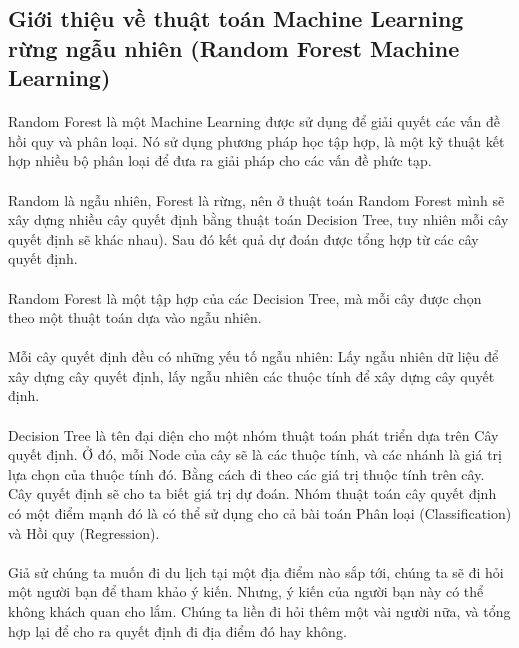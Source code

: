 \documentclass{article}
\begin{document}
\subsection{Giới thiệu về thuật toán Machine Learning rừng ngẫu nhiên (Random Forest Machine Learning)}
\paragraph{}
Random Forest là một Machine Learning được sử dụng để giải quyết các vấn đề hồi quy và phân loại. Nó sử dụng phương pháp học tập hợp, là một kỹ thuật kết hợp nhiều bộ phân loại để đưa ra giải pháp cho các vấn đề phức tạp.
\paragraph{}
Random là ngẫu nhiên, Forest là rừng, nên ở thuật toán Random Forest mình sẽ xây dựng nhiều cây quyết định bằng thuật toán Decision Tree, tuy nhiên mỗi cây quyết định sẽ khác nhau). Sau đó kết quả dự đoán được tổng hợp từ các cây quyết định.
\paragraph{}
Random Forest là một tập hợp của các Decision Tree, mà mỗi cây được chọn theo một thuật toán dựa vào ngẫu nhiên.
\paragraph{}Mỗi cây quyết định đều có những yếu tố ngẫu nhiên: Lấy ngẫu nhiên dữ liệu để xây dựng cây quyết định, lấy ngẫu nhiên các thuộc tính để xây dựng cây quyết định.
\paragraph{}
Decision Tree là tên đại diện cho một nhóm thuật toán phát triển dựa trên Cây quyết định. Ở đó, mỗi Node của cây sẽ là các thuộc tính, và các nhánh là giá trị lựa chọn của thuộc tính đó. Bằng cách đi theo các giá trị thuộc tính trên cây. Cây quyết định sẽ cho ta biết giá trị dự đoán. Nhóm thuật toán cây quyết định có một điểm mạnh đó là có thể sử dụng cho cả bài toán Phân loại (Classification) và Hồi quy (Regression).
\paragraph{}
Giả sử chúng ta muốn đi du lịch tại một địa điểm nào sắp tới, chúng ta sẽ đi hỏi một người bạn để tham khảo ý kiến. Nhưng, ý kiến của người bạn này có thể không khách quan cho lắm. Chúng ta liền đi hỏi thêm một vài người nữa, và tổng hợp lại để cho ra quyết định đi địa điểm đó hay không.
\end{document}
